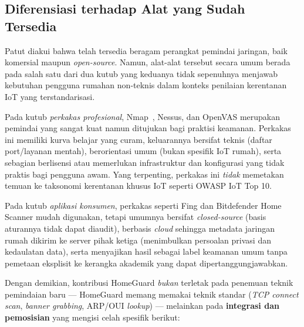 %

\subsection{Diferensiasi terhadap Alat yang Sudah Tersedia}

Patut diakui bahwa telah tersedia beragam perangkat pemindai jaringan,
baik komersial maupun \textit{open-source}. Namun, alat-alat tersebut
secara umum berada pada salah satu dari dua kutub yang keduanya tidak
sepenuhnya menjawab kebutuhan pengguna rumahan non-teknis dalam konteks
penilaian kerentanan IoT yang terstandarisasi.

Pada kutub \emph{perkakas profesional}, Nmap~\cite{b13}, Nessus, dan OpenVAS
merupakan pemindai yang sangat kuat namun ditujukan bagi praktisi
keamanan. Perkakas ini memiliki kurva belajar yang curam, keluarannya
bersifat teknis (daftar port/layanan mentah), berorientasi umum
(bukan spesifik IoT rumah), serta sebagian berlisensi atau memerlukan
infrastruktur dan konfigurasi yang tidak praktis bagi pengguna awam.
Yang terpenting, perkakas ini \emph{tidak} memetakan temuan ke taksonomi
kerentanan khusus IoT seperti OWASP IoT Top 10.

Pada kutub \emph{aplikasi konsumen}, perkakas seperti Fing dan
Bitdefender Home Scanner mudah digunakan, tetapi umumnya bersifat
\textit{closed-source} (basis aturannya tidak dapat diaudit), berbasis
\textit{cloud} sehingga metadata jaringan rumah dikirim ke server pihak
ketiga (menimbulkan persoalan privasi dan kedaulatan data), serta
menyajikan hasil sebagai label keamanan umum tanpa pemetaan eksplisit ke
kerangka akademik yang dapat dipertanggungjawabkan.

Dengan demikian, kontribusi HomeGuard \emph{bukan} terletak pada penemuan
teknik pemindaian baru --- HomeGuard memang memakai teknik standar
(\textit{TCP connect scan}, \textit{banner grabbing}, ARP/OUI
\textit{lookup}) --- melainkan pada \textbf{integrasi dan pemosisian}
yang mengisi celah spesifik berikut:


